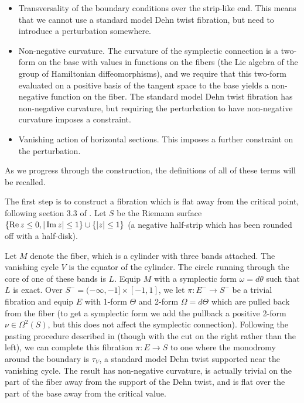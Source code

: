 \documentclass[12pt]{amsart}
\begin{document}
\begin{itemize}
\item Transversality of the boundary conditions over the strip-like
  end. This means that we cannot use a standard model Dehn twist
  fibration, but need to introduce a perturbation somewhere.

\item Non-negative curvature. The curvature of the symplectic
  connection is a two-form on the base with values in functions on the
  fibers (the Lie algebra of the group of Hamiltonian
  diffeomorphisms), and we require that this two-form evaluated on a
  positive basis of the tangent space to the base yields a non-negative
  function on the fiber. The standard model Dehn twist fibration has
  non-negative curvature, but requiring the perturbation to have
  non-negative curvature imposes a constraint.

\item Vanishing action of horizontal sections. This imposes a further
  constraint on the perturbation.
\end{itemize}

As we progress through the construction, the definitions of all of
these terms will be recalled.

The first step is to construct a fibration which is flat away from the
critical point, following section 3.3 of \cite{seidel-les}. Let $S$ be
the Riemann surface $\{\operatorname{Re} z \leq 0, |\operatorname{Im} z| \leq 1\} \cup \{|z| \leq 1\}$ (a negative half-strip which has been rounded off with a
half-disk). 

Let $M$ denote the fiber, which is a cylinder with three bands
attached. The vanishing cycle $V$ is the equator of the cylinder. The
circle running through the core of one of these bands is $L$. Equip
$M$ with a symplectic form $\omega = d\theta$ such that $L$ is exact. Over $S^- =
(-\infty,-1]\times [-1,1]$, we let $\pi: E^- \to S^-$ be a trivial
fibration and equip $E$ with 1-form $\Theta$ and 2-form $\Omega =
d\Theta$ which are pulled back from the fiber (to get a symplectic
form we add the pullback a positive 2-form $\nu \in \Omega^2(S)$, but
this does not affect the symplectic connection). Following the pasting
procedure described in \cite[\S 3.3]{seidel-les} (though with the cut
on the right rather than the left), we can complete this fibration
$\pi: E \to S$ to one where the monodromy around the boundary is
$\tau_V$, a standard model Dehn twist supported near the vanishing
cycle. The result has non-negative curvature, is actually trivial on
the part of the fiber away from the support of the Dehn twist, and is
flat over the part of the base away from the critical value.
\end{document}
